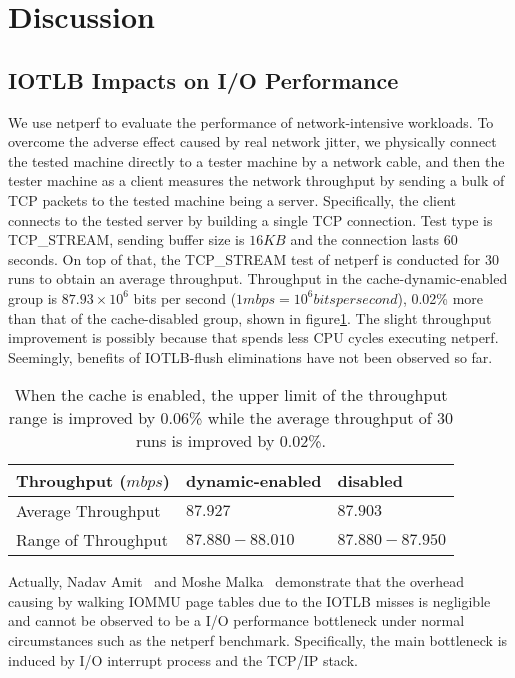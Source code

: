 \section{Discussion} \label{sec:dis}
\subsection{IOTLB Impacts on I/O Performance}

We use netperf to evaluate the performance of network-intensive workloads. To overcome the adverse effect caused by real network jitter, we physically connect the tested machine directly to a tester machine by a network cable, and then the tester machine as a client measures the network throughput by sending a bulk of TCP packets to the tested machine being a server. Specifically, the client connects to the tested server by building a single TCP connection. Test type is TCP\_STREAM, sending buffer size is $16KB$ and the connection lasts $60$ seconds. On top of that, the TCP\_STREAM test of netperf is conducted for $30$ runs to obtain an average throughput. Throughput in the cache-dynamic-enabled group is $87.93 \times 10^6$ bits per second ($1 mbps = 10^6 bits per second$), 0.02\% more than that of the cache-disabled group, shown in figure\ref{tab:netperf}. The slight throughput improvement is possibly because that \name spends less CPU cycles executing netperf. Seemingly, benefits of IOTLB-flush eliminations have not been observed so far.

\begin{table}[!ht]
\footnotesize
\begin{center}
\begin{tabular}{|l|l|l|}
\hline
{\textbf{Throughput ($mbps$)}} & {\textbf{dynamic-enabled}} & {\textbf{disabled}}    \\ \hline
Average Throughput &  $87.927$ & $87.903$ \\ \hline
Range of Throughput & $87.880-88.010$ & $87.880-87.950$ \\ \hline
\end{tabular}
\end{center}
\caption{When the cache is enabled, the upper limit of the throughput range is improved by 0.06\% while the average throughput of 30 runs is improved by 0.02\%. }
\label{tab:netperf}
\end{table}

Actually, Nadav Amit~\cite{amit2012iommu} and Moshe Malka~\cite{malka2015riommu} demonstrate that the overhead causing by walking IOMMU page tables due to the IOTLB misses is negligible and cannot be observed to be a I/O performance bottleneck under normal circumstances such as the netperf benchmark. Specifically, the main bottleneck is induced by I/O interrupt process and the TCP/IP stack.

